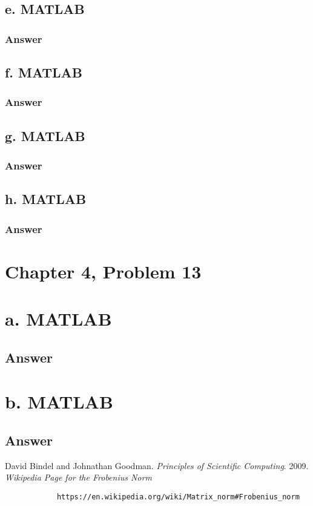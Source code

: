 \documentclass{article}
\begin{document}
		\subsection{e. MATLAB}
		\subsubsection{Answer}
		
		\subsection{f. MATLAB}
		\subsubsection{Answer}
		
		\subsection{g. MATLAB}
		\subsubsection{Answer}
		
		\subsection{h. MATLAB}
		\subsubsection{Answer}
		
	\section{Chapter 4, Problem 13}
		\section{a. MATLAB}
			\subsection{Answer}
			
		\section{b. MATLAB}
			\subsection{Answer}
	
	\begin{thebibliography}{2}
		David Bindel and Johnathan Goodman.
		\textit{Principles of Scientific Computing}. 
		2009.
		\textit{Wikipedia Page for the Frobenius Norm}
		\begin{verbatim}
			https://en.wikipedia.org/wiki/Matrix_norm#Frobenius_norm
		\end{verbatim}
		
	\end{thebibliography}
	
	
	 
\end{document}
